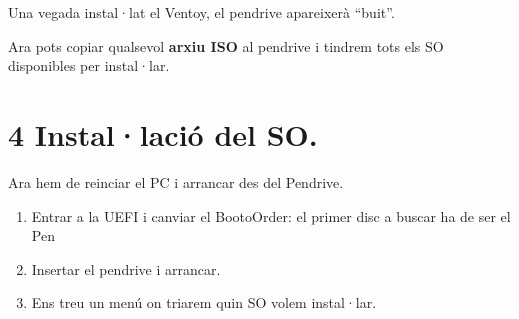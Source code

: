 \documentclass[
  a4paper,
]{article}
\providecommand{\tightlist}{%
  \setlength{\itemsep}{0pt}\setlength{\parskip}{0pt}}
\begin{document}
Una vegada instal·lat el Ventoy, el pendrive apareixerà ``buit''.

Ara pots copiar qualsevol \textbf{arxiu ISO} al pendrive i tindrem tots
els SO disponibles per instal·lar.

\section{4 Instal·lació del SO.}\label{installaciuxf3-del-so.}

Ara hem de reinciar el PC i arrancar des del Pendrive.

\begin{enumerate}
\def\labelenumi{\arabic{enumi}.}
\tightlist
\item
  Entrar a la UEFI i canviar el BootoOrder: el primer disc a buscar ha
  de ser el Pen
\item
  Insertar el pendrive i arrancar.
\item
  Ens treu un menú on triarem quin SO volem instal·lar.
\end{enumerate}
\end{document}
